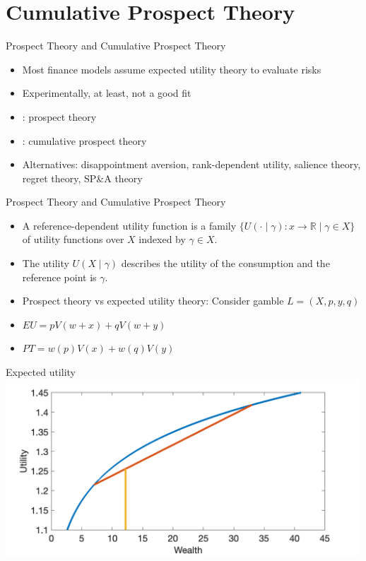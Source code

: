 \documentclass[11pt, aspectratio=169]{beamer}
\begin{document}
\section{Cumulative Prospect Theory}
\begin{frame}{Prospect Theory and Cumulative Prospect Theory}
    \begin{itemize}
        \item Most finance models assume expected utility theory to evaluate risks\bigskip
        \item Experimentally, at least, not a good fit\bigskip
        \item \citet{KahnemanTversky1979}: prospect theory\bigskip
        \item \citet{TverskyKahneman1992}: cumulative prospect theory\bigskip
        \item Alternatives: disappointment aversion, rank-dependent utility, salience theory, regret theory, SP\&A theory\bigskip
    \end{itemize}
\end{frame}


\begin{frame}{Prospect Theory and Cumulative Prospect Theory}
    \begin{itemize}
        \item A reference-dependent utility function is a family $\{U(\cdot \mid \gamma):x \longrightarrow \mathbb{R} \mid \gamma \in X\}$  of utility functions over $X$ indexed by $\gamma \in X$.\bigskip
        \item The utility $U(X \mid \gamma)$ describes the utility of the consumption and the reference point is $\gamma$.\bigskip
        \item Prospect theory vs expected utility theory: Consider gamble $L = (X, p, y, q)$\bigskip
        \item  $EU=p V(w +x)+qV(w+y)$\bigskip
       \item $PT=w(p)V(x)+w(q)V(y)$\bigskip
\end{itemize}
\end{frame}


\begin{frame}{Expected utility}
\centering
\includegraphics[width= 0.99\textwidth]{expected_utility}
\end{frame}
\end{document}

